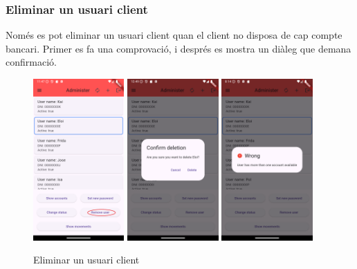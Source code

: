 \documentclass[a4paper,12pt,twoside]{ThesisStyle}
\begin{document}
\clearpage
\subsubsection{Eliminar un usuari client}
\label{subsubsec: Eliminar un usuari client}

Només es pot eliminar un usuari client quan el client no disposa de cap compte bancari. Primer es fa una comprovació, i després es mostra un diàleg que demana confirmació.

\begin{figure}[h]
    \centering
    \includegraphics[width=0.31\textwidth]{imatges/mainAdmin4.png}
    \includegraphics[width=0.31\textwidth]{imatges/delete1.png}
    \includegraphics[width=0.31\textwidth]{imatges/removeuserNo.png}
    \caption{Eliminar un usuari client}
    \label{fig: Eliminar un usuari client}
\end{figure}
\end{document}
